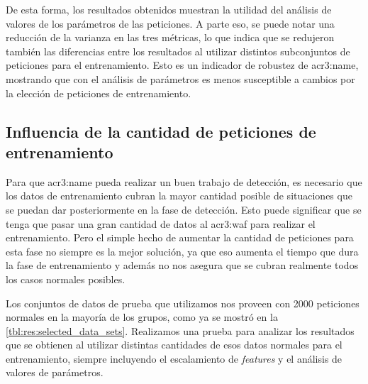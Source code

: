 De esta forma, los resultados obtenidos muestran la utilidad del análisis
de valores de los parámetros de las peticiones. A parte eso, se puede
notar una reducción de la varianza en las tres métricas, lo que indica
que se redujeron también las diferencias entre los resultados al utilizar
distintos subconjuntos de peticiones para el entrenamiento. Esto es un
indicador de robustez de \gls{acr3:name}, mostrando que con el análisis
de parámetros es menos susceptible a cambios por la elección de peticiones
de entrenamiento.


\subsection{Influencia de la cantidad de peticiones de entrenamiento}

Para que \gls{acr3:name} pueda realizar un buen trabajo de detección,
es necesario que los datos de entrenamiento cubran la mayor cantidad
posible de situaciones que se puedan dar posteriormente en la fase de
detección. Esto puede significar que se tenga que pasar una gran cantidad
de datos al \gls{acr3:waf} para realizar el entrenamiento. Pero el simple
hecho de aumentar la cantidad de peticiones para esta fase no siempre
es la mejor solución, ya que eso aumenta el tiempo que dura la fase de
entrenamiento y además no nos asegura que se cubran realmente todos los
casos normales posibles.

Los conjuntos de datos de prueba que utilizamos nos proveen con \num{2000}
peticiones normales en la mayoría de los grupos, como ya se mostró en la
\autoref{tbl:res:selected_data_sets}. Realizamos una prueba para analizar
los resultados que se obtienen al utilizar distintas cantidades de esos
datos normales para el entrenamiento, siempre incluyendo el escalamiento
de \textit{features} y el análisis de valores de parámetros.

